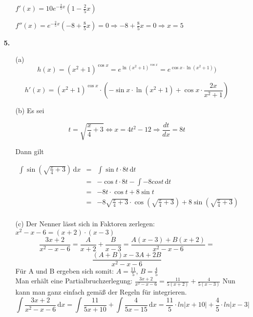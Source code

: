 \documentclass[a4paper,11pt,fleqn]{scrartcl}
\newcommand{\bra}[1]{\left(#1\right)}
\newcommand{\dX}[1]{\, \mathrm{d}#1}
\newcommand{\dx}[0]{\dX{x}}
\newcommand{\dt}[0]{\dX{t}}
\begin{document}
\begin{enumerate}
\begin{enumerate}

                \( f'(x) = 10 e^{-\frac{2}{5}x} \bra{1 - \frac{2}{5}x} \)

                \( f''(x) = e^{-\frac{2}{5}x} \bra{-8 + \frac{8}{5}x} = 0 \Rightarrow -8 + \frac{8}{5}x = 0 \Rightarrow x = 5 \)


        \end{enumerate}
    \item[\textbf{5.}]
        \begin{enumerate}
            \item[(a)]
                \[ h(x) = \bra{x^2+1}^{\cos x} = e^{\ln \bra{x^2+1}^{\cos x}} = e^{\cos x \cdot \ln \bra{x^2+1}}) \]

                \[ h'(x) = \bra{x^2+1}^{\cos x} \cdot \bra{ -\sin x \cdot \ln \bra{x^2+1} + \cos x \cdot \frac{2x}{x^2+1} } \]

            \item[(b)]
                Es sei

                \[ t = \sqrt{\frac{x}{4} + 3} \Leftrightarrow x = 4t^2-12 \Rightarrow \frac{dt}{dx} = 8t  \]

                Dann gilt

                \begin{eqnarray*}
                    \int \sin\bra{\sqrt{\frac{x}{4} + 3}} \dx &=& \int \sin t \cdot 8t \dt\\
                    &=& - \cos t \cdot 8t - \int -8 cos t \dt \\
                    &=& -8t \cdot \cos t + 8 \sin t\\
                    &=& -8 \sqrt{\frac{x}{4} + 3} \cdot \cos \bra{\sqrt{\frac{x}{4} + 3}} + 8 \sin \bra{\sqrt{\frac{x}{4} + 3}}\\
                \end{eqnarray*}



            \item[(c)]
                Der Nenner lässt sich in Faktoren zerlegen: \(x^2-x-6 = (x+2)\cdot(x-3)\)
                \[ \frac{3x+2}{x^2-x-6} = \frac{A}{x+2} + \frac{B}{x-3} = \frac{A(x-3)+B(x+2)}{x^2-x-6} =\]
                \[ \frac{(A+B)x -3A + 2B}{x^2-x-6}\]
                Für A und B ergeben sich somit: $A=\frac{11}{5}$, $B=\frac{4}{5}$ \\
                Man erhält eine Partialbruchzerlegung: \( \frac{3x+2}{x^2-x-6} = \frac{11}{5(x+2)} + \frac{4}{5(x-3)} \)
                Nun kann man ganz einfach gemäß der Regeln für integrieren. \\
                \[ \int \frac{3x+2}{x^2-x-6} \dx = \int \frac{11}{5x+10} + \int \frac{4}{5x-15} \dx = \frac{11}{5} \cdot ln|x+10| + \frac{4}{5} \cdot ln|x-3| \]


\end{enumerate}
\end{enumerate}
\end{document}
